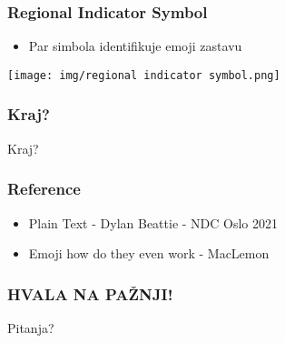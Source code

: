 \documentclass{beamer}
\begin{document}
\begin{frame}
  \frametitle{Regional Indicator Symbol}
  \begin{itemize}
    \item Par simbola identifikuje emoji zastavu
  \end{itemize}

  \begin{center}
    \texttt{[image: img/regional indicator symbol.png]}
  \end{center}
\end{frame}

\begin{frame}
  \frametitle{Kraj? }
  \begin{center}
      \Huge Kraj?    
  \end{center}
\end{frame}

\begin{frame}
  \frametitle{Reference}
  \begin{itemize}
    \item Plain Text - Dylan Beattie - NDC Oslo 2021 \newline
    \item Emoji how do they even work - MacLemon \newline
  \end{itemize}
\end{frame}

\begin{frame}
    \frametitle{HVALA NA PAŽNJI!}
    \begin{center}
        \Huge Pitanja?    
    \end{center}
\end{frame}
\end{document}
